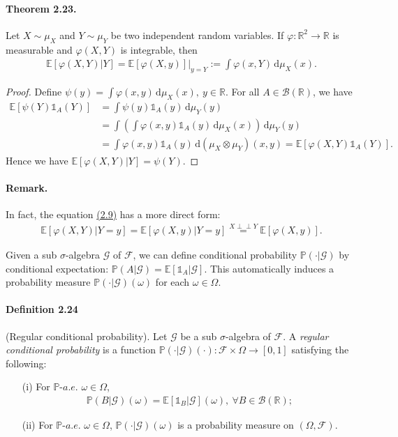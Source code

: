 \documentclass{article}
\numberwithin{equation}{section}
\newcommand{\E}{\mathbb{E}}
\newcommand{\ind}{\perp\!\!\!\perp}
\renewcommand{\P}{\mathbb{P}}
\renewcommand{\d}{\mathrm{d}}
\theoremstyle{plain}
\theoremstyle{definition}
\begin{document}
\paragraph{Theorem 2.23.\label{thm:2.23}} Let $X\sim\mu_X$ and $Y\sim\mu_Y$ be two independent random variables. If $\varphi:\mathbb{R}^2\to\mathbb{R}$ is measurable and $\varphi(X,Y)$ is integrable, then
\begin{align*}
	\E\left[\varphi(X,Y)|Y\right] = \E[\varphi(X,y)]\big|_{y=Y}:=\int\varphi(x,Y)\,\d \mu_X(x).\tag{2.9}\label{eq:2.9}
\end{align*}
\begin{proof}
Define $\psi(y)=\int\varphi(x,y)\,\d \mu_X(x),\ y\in\mathbb{R}$. For all $A\in\mathscr{B}(\mathbb{R})$, we have
\begin{align*}
	\E[\psi(Y)\mathds{1}_A(Y)] &= \int\psi(y)\mathds{1}_A(y)\,\d \mu_Y(y)\\
	&= \int\left(\int\varphi(x,y)\mathds{1}_A(y)\,\d \mu_X(x)\right)\,\d \mu_Y(y)\\
	&= \int\varphi(x,y)\mathds{1}_A(y)\,\d (\mu_X\otimes\mu_Y)(x,y) = \E\left[\varphi(X,Y)\mathds{1}_A(Y)\right].\tag{By Fubini's theorem}
\end{align*}
Hence we have $\E\left[\varphi(X,Y)|Y\right]=\psi(Y)$.
\end{proof}
\paragraph{Remark.} In fact, the equation \hyperref[eq:2.9]{(2.9)} has a more direct form:
\begin{align*}
	\E[\varphi(X,Y)|Y=y]=\E[\varphi(X,y)|Y=y] \overset{X\ind Y}{=} \E[\varphi(X,y)].
\end{align*}

Given a sub $\sigma$-algebra $\mathscr{G}$ of $\mathscr{F}$, we can define conditional probability $\mathbb{P}(\cdot|\mathscr{G})$ by conditional expectation: $\mathbb{P}(A|\mathscr{G})=\E[\mathds{1}_A|\mathscr{G}]$. This automatically induces a probability measure $\P(\cdot|\mathscr{G})(\omega)$ for each $\omega\in\Omega$.

\paragraph{Definition 2.24\label{def:2.24}} (Regular conditional probability). Let $\mathscr{G}$ be a sub $\sigma$-algebra of $\mathscr{F}$. A \textit{regular conditional probability} is a function $\P(\cdot|\mathscr{G})(\cdot):\mathscr{F}\times\Omega\to[0,1]$ satisfying the following:
\begin{itemize}
	\item[(i)] For $\P\textit{-a.e.}$ $\omega\in\Omega$,
	\begin{align*}
		\P(B|\mathscr{G})(\omega)=\E\left[\mathds{1}_B|\mathscr{G}\right](\omega),\ \forall B\in\mathscr{B}(\mathbb{R});
	\end{align*}
	\item[(ii)] For $\P\textit{-a.e.}$ $\omega\in\Omega$, $\P(\cdot|\mathscr{G})(\omega)$ is a probability measure on $(\Omega,\mathscr{F})$.
\end{itemize}
\end{document}
